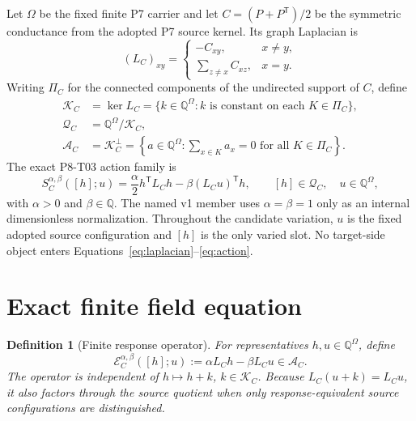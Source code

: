 \documentclass[11pt]{article}
\newtheorem{definition}{Definition}
\newcommand{\Q}{\mathbb Q}
\newcommand{\Kspace}{\mathcal K_C}
\newcommand{\Qspace}{\mathcal Q_C}
\newcommand{\Aspace}{\mathcal A_C}
\newcommand{\Eop}{\mathcal E_C^{\alpha,\beta}}
\begin{document}
Let \(\Omega\) be the fixed finite P7 carrier and let
\(C=(P+P^{\mathsf T})/2\) be the symmetric conductance from the adopted P7
source kernel.  Its graph Laplacian is
\begin{equation}
 (L_C)_{xy}=
 \begin{cases}
 -C_{xy},&x\ne y,\\
 \displaystyle\sum_{z\ne x}C_{xz},&x=y.
 \end{cases}
 \label{eq:laplacian}
\end{equation}
Writing \(\Pi_C\) for the connected components of the undirected support of
\(C\), define
\begin{align}
 \Kspace&=\ker L_C
 =\{k\in\Q^\Omega:k\text{ is constant on each }K\in\Pi_C\},\\
 \Qspace&=\Q^\Omega/\Kspace,\\
 \Aspace&=\Kspace^\perp
 =\left\{a\in\Q^\Omega:
   \sum_{x\in K}a_x=0\text{ for all }K\in\Pi_C\right\}.
 \label{eq:spaces}
\end{align}
The exact P8-T03 action family is
\begin{equation}
 S_C^{\alpha,\beta}([h];u)
 =\frac{\alpha}{2}h^{\mathsf T}L_Ch
  -\beta(L_Cu)^{\mathsf T}h,
 \qquad
 [h]\in\Qspace,\quad u\in\Q^\Omega,
 \label{eq:action}
\end{equation}
with \(\alpha>0\) and \(\beta\in\Q\).  The named v1 member uses
\(\alpha=\beta=1\) only as an internal dimensionless normalization.
Throughout the candidate variation, \(u\) is the fixed adopted source
configuration and \([h]\) is the only varied slot.  No target-side object
enters Equations~\eqref{eq:laplacian}--\eqref{eq:action}.

\section{Exact finite field equation}

\begin{definition}[Finite response operator]
For representatives \(h,u\in\Q^\Omega\), define
\begin{equation}
 \Eop([h];u)
 :=\alpha L_Ch-\beta L_Cu\in\Aspace.
 \label{eq:response}
\end{equation}
The operator is independent of \(h\mapsto h+k\), \(k\in\Kspace\).
Because \(L_C(u+k)=L_Cu\), it also factors through the source quotient when
only response-equivalent source configurations are distinguished.
\end{definition}
\end{document}
